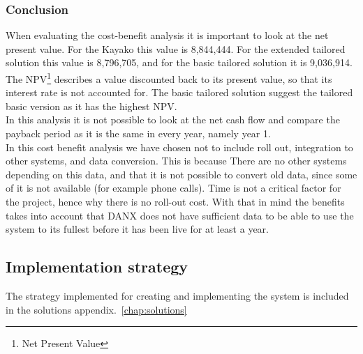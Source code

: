 \subsubsection{Conclusion}

When evaluating the cost-benefit analysis it is important to look at the net present value. For the Kayako this value is 8,844,444. For the extended tailored solution this value is 8,796,705, and for the basic tailored solution it is 9,036,914.\cite{img002}\cite{img003}\cite{img004}
The NPV\footnote{Net Present Value} describes a value discounted back to its present value, so that its interest rate is not accounted for. The basic tailored solution suggest the tailored basic version as it has the highest NPV.\\
In this analysis it is not possible to look at the net cash flow and compare the payback period as it is the same in every year, namely year 1.\\
In this cost benefit analysis we have chosen not to include roll out, integration to other systems, and data conversion. This is because There are no other systems depending on this data, and that it is not possible to convert old data, since some of it is not available (for example phone calls). Time is not a critical factor for the project, hence why there is no roll-out cost. With that in mind the benefits takes into account that DANX does not have sufficient data to be able to use the system to its fullest before it has been live for at least a year.

\subsection{Implementation strategy}
The strategy implemented for creating and implementing the system is included in the solutions appendix.~\ref{chap:solutions}
